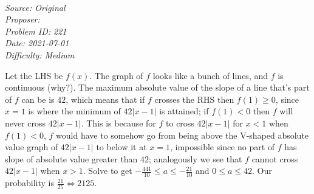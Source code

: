 \SSbreak\\
\emph{Source: Original}\\
\emph{Proposer: \Paiya}\\ %
\emph{Problem ID: 221}\\
\emph{Date: 2021-07-01}\\
\emph{Difficulty: Medium}\\
\SSbreak

\bigskip

\begin{solution}\hfil\medskip
	
    Let the LHS be $f(x)$. The graph of $f$ looks like a bunch of lines, and $f$ is continuous (why?). 
    The maximum absolute value of the slope of a line that's part of $f$ can be is $42$, which means that if $f$ crosses 
    the RHS then $f(1) \geq 0$, since $x = 1$ is where the minimum of $42|x-1|$ is attained; 
    if $f(1) < 0$ then $f$ will never cross $42|x-1|$. This is because for $f$ to cross $42|x-1|$ for $x < 1$ when $f(1) < 0$, 
    $f$ would have to somehow go from being above the V-shaped absolute value graph of $42|x-1|$ to below it at $x = 1$, impossible 
    since no part of $f$ has slope of absolute value greater than $42$; analogously we see that $f$ cannot cross $42|x-1|$ when $x > 1$. Solve to get 
    $-\frac{441}{10} \leq a \leq -\frac{21}{10}$ and $0 \leq a \leq 42$. Our probability is $\frac{21}{25} \iff \boxed{2125}.$
\end{solution}\bigskip
